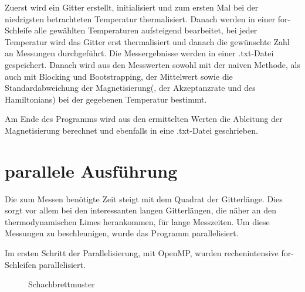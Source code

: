 \documentclass{scrreprt}
\begin{document}
	Zuerst wird ein Gitter erstellt, initialisiert und zum ersten Mal bei der niedrigsten betrachteten Temperatur thermalisiert. Danach werden in einer for-Schleife alle gewählten Temperaturen aufsteigend bearbeitet, bei jeder Temperatur wird das Gitter erst thermalisiert und danach die gewünschte Zahl an Messungen durchgeführt.
	Die Messergebnisse werden in einer .txt-Datei gespeichert. Danach wird aus den Messwerten sowohl mit der naiven Methode, als auch mit Blocking und Bootstrapping, der Mittelwert sowie die Standardabweichung der Magnetisierung(, der Akzeptanzrate und des Hamiltonians) bei der gegebenen Temperatur bestimmt.
	
	Am Ende des Programms wird aus den ermittelten Werten die Ableitung der Magnetisierung berechnet und ebenfalls in eine .txt-Datei geschrieben.
		
	
	\section{parallele Ausführung}
	\label{sec:parallelimplementierung}


	
	Die zum Messen benötigte Zeit steigt mit dem Quadrat der Gitterlänge. Dies sorgt vor allem bei den interessanten langen Gitterlängen, die näher an den thermodynamischen Limes herankommen, für lange Messzeiten. Um diese Messungen zu beschleunigen, wurde das Programm parallelisiert.
	
	Im ersten Schritt der Parallelisierung, mit OpenMP, wurden rechenintensive for-Schleifen parallelisiert.
	
	
	\begin{wrapfigure}{r}{3.5in}
		\centering
		
		\label{fig:schachbrett}
		\caption{Schachbrettmuster}
	\end{wrapfigure}
	
\end{document}
